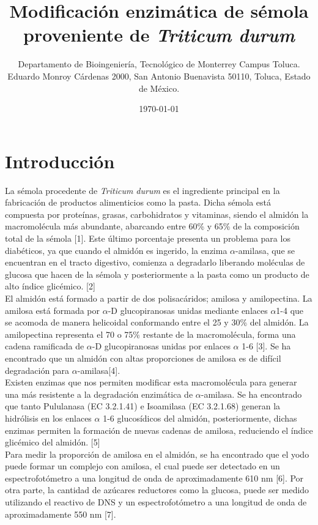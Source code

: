 \documentclass{article}
\title{Modificación enzimática de sémola proveniente de \textit{Triticum durum}}
\author{Departamento de Bioingeniería, Tecnológico de Monterrey Campus Toluca.\\ Eduardo Monroy Cárdenas 2000, San Antonio Buenavista 50110, Toluca, Estado de México.}
\date{\today}
\begin{document}
\maketitle


\section{Introducción}
	
La sémola procedente de \textit{Triticum durum} es el ingrediente principal en la fabricación de productos alimenticios como la pasta. Dicha sémola está compuesta por proteínas, grasas, carbohidratos y vitaminas, siendo el almidón la macromolécula más abundante, abarcando entre 60\% y 65\% de la composición total de la sémola [1]. Este último porcentaje presenta un problema para los diabéticos, ya que cuando el almidón es ingerido, la enzima $\alpha$-amilasa, que se encuentran en el tracto digestivo, comienza a degradarlo liberando moléculas de glucosa que hacen de la sémola y posteriormente a la pasta como un producto de alto índice glicémico. [2]\\

El almidón está formado a partir de dos polisacáridos; amilosa y amilopectina. La amilosa está formada por $\alpha$-D glucopiranosas unidas mediante enlaces $\alpha$1-4 que se acomoda de manera helicoidal conformando entre el 25 y 30\% del almidón. La amilopectina representa el 70 o 75\% restante de la macromolécula, forma una cadena ramificada de $\alpha$-D glucopiranosas unidas por enlaces $\alpha$ 1-6 [3]. Se ha encontrado que un almidón con altas proporciones de amilosa es de difícil degradación para $\alpha$-amilasa[4].\\

Existen enzimas que nos permiten modificar esta macromolécula para generar una más resistente a la degradación enzimática de $\alpha$-amilasa. Se ha encontrado que tanto  Pululanasa (EC 3.2.1.41) e Isoamilasa (EC 3.2.1.68) generan la hidrólisis en los enlaces $\alpha$ 1-6 glucosídicos del almidón, posteriormente, dichas enzimas permiten la formación de nuevas cadenas de amilosa, reduciendo el índice glicémico del almidón. [5]\\

Para medir la proporción de amilosa en el almidón, se ha encontrado que el yodo puede formar un complejo con amilosa, el cual puede ser detectado en un espectrofotómetro a una longitud de onda de aproximadamente 610 nm [6]. Por otra parte, la cantidad de azúcares reductores como la glucosa, puede ser medido utilizando el reactivo de DNS y un espectrofotómetro a una longitud de onda de aproximadamente 550 nm [7].\\
\end{document}
